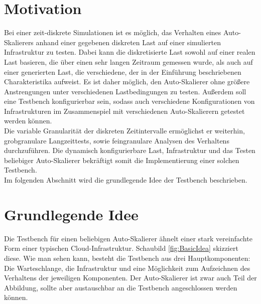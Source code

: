 \section{Motivation}
\label{sec:Introduction:Motivation}
Bei einer zeit-diskrete Simulationen ist es möglich, das Verhalten eines Auto-Skalierers anhand einer gegebenen diskreten Last auf einer simulierten Infrastruktur zu testen. Dabei kann die diskretisierte Last sowohl auf einer realen Last basieren, die über einen sehr langen Zeitraum gemessen wurde, als auch auf einer generierten Last, die verschiedene, der in der Einführung beschriebenen Charakteristika aufweist. Es ist daher möglich, den Auto-Skalierer ohne größere Anstrengungen unter verschiedenen Lastbedingungen zu testen. Außerdem soll eine Testbench konfigurierbar sein, sodass auch verschiedene Konfigurationen von Infrastrukturen im Zusammenspiel mit verschiedenen Auto-Skalierern getestet werden können.\\
Die variable Granularität der diskreten Zeitintervalle ermöglichst er weiterhin, grobgranulare Langzeittests, sowie feingranulare Analysen des Verhaltens durchzuführen. Die dynamisch konfigurierbare Last, Infrastruktur und das Testen beliebiger Auto-Skalierer bekräftigt somit die Implementierung einer solchen Testbench. \\
Im folgenden Abschnitt wird die grundlegende Idee der Testbench beschrieben.




\section{Grundlegende Idee}

Die Testbench für einen beliebigen Auto-Skalierer ähnelt einer stark vereinfachte Form einer typischen Cloud-Infrastruktur. Schaubild \ref{fig:BasicIdea} skizziert diese. Wie man sehen kann, besteht die Testbench aus drei Hauptkomponenten: Die Warteschlange, die Infrastruktur und eine Möglichkeit zum Aufzeichnen des Verhaltens der jeweiligen Komponenten. Der Auto-Skalierer ist zwar auch Teil der Abbildung, sollte aber austauschbar an die Testbench angeschlossen werden können. \\





